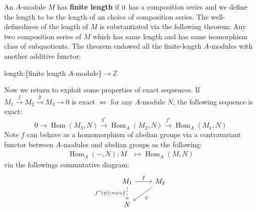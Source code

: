 \documentclass[12pt]{article}
\theoremstyle{definition}
\theoremstyle{plain}
\DeclareMathOperator{\Hom}{Hom}
\newcommand{\z}{\mathbb{Z}}
\begin{document}
\Def An $A$-module $M$ has \textbf{finite length} if it has a composition series and we define the length to be the length of an choice of composition series.
\Rmk The well-definedness of the length of $M$ is substantiated via the following theorem:
 Any two composition series of $M$ which has same length and has same isomorphism class of subquotients.
\Rmk The theorem endowed all the finite-length $A$-modules with another additive functor:
\begin{center}
  length:\{finite length $A$-module\}$\longrightarrow \z$
\end{center}
Now we return to exploit some properties of exact sequences.
\Prop If $M_1\overset{f}{\to}M_2\overset{g}{\to}M_3\to 0$ is exact $\iff$ for any $A$-module $N$, the following sequence is exact:
$$ 0\to \Hom(M_3, N)\overset{g^*}{\to} \Hom_A(M_2, N)\overset{f^*}{\to} \Hom_A(M_1, N)$$
\Rmk Note $f$ can behave as a homomorphism of abelian groups via a contravariant functor between $A$-modules and abelian groups as the following:
\begin{align*}
  \Hom_A(-, N):M&\mapsto \Hom_A(M, N)
\end{align*}
via the followings commutative diagram:
\begin{equation}
  \begin{tikzcd}
    M_1\ar{r}{f}\ar[dashed]{d}[swap]{f^*(\psi):=\psi\circ f} & M_2\ar{ld}{\psi}\\
    N
  \end{tikzcd}
\end{equation}
\end{document}
